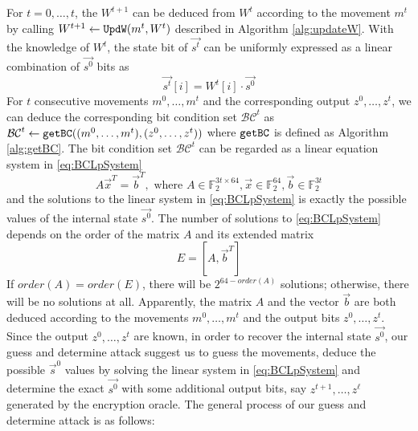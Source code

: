For $t=0,\ldots, t$, the $W^{t+1}$ can be deduced from $W^t$ according to the movement $m^t$ by calling
$W^{t+1}\leftarrow {\tt UpdW}(m^t, W^t)$ described in Algorithm \ref{alg:updateW}.
With the knowledge of $W^t$, the state bit of $\vec{s^t}$ can be uniformly expressed as a linear combination of $\vec{s^0}$ bits as
\begin{equation}\label{eq:ExpressStwithS0}
\vec{s^t}[i]=W^t[i]\cdot \vec{s^0}
\end{equation}
For $t$ consecutive movements $m^0,\ldots,m^t$ and the corresponding output $z^0,\ldots, z^t$, we can deduce the corresponding bit condition set $\mathcal{BC}^t$ as $\mathcal{BC}^t\leftarrow {\tt{getBC}}((m^0,\ldots, m^t), (z^0,\ldots, z^t))$ where ${\tt{getBC}}$ is defined as Algorithm \ref{alg:getBC}.
The bit condition set $\mathcal{BC}^t$ can be regarded as a linear equation system in \eqref{eq:BCLpSystem}
\begin{equation}\label{eq:BCLpSystem}
  A\vec x^T=\vec b^T, \text{ where } A\in \mathbb{F}_2^{3t\times 64}, \vec x\in \mathbb{F}_2^{64}, \vec b\in \mathbb{F}_2^{3t}
\end{equation}
and the solutions to the linear system in \eqref{eq:BCLpSystem} is exactly the possible values of the internal state $\vec{s^0}$.
The number of solutions to \eqref{eq:BCLpSystem} depends on the order of the matrix $A$ and its extended matrix
\begin{equation}\label{eq:ExtendedMatrixOfA}
  E=[A,\vec b^T]
\end{equation}
If $order(A)=order(E)$, there will be $2^{64-order(A)}$ solutions; otherwise, there will be no solutions at all.
Apparently, the matrix $A$ and the vector $\vec b$ are both deduced according to the movements $m^0,\ldots, m^t$ and the output bits $z^0,\ldots, z^t$.
Since the output $z^0,\ldots, z^t$ are known, in order to recover the internal state $\vec{s^0}$, our guess and determine attack suggest us to guess the movements, deduce the possible $\vec s^0$ values by solving the linear system in \eqref{eq:BCLpSystem} and determine the exact $\vec{s^0}$ with some additional output bits, say $z^{t+1},\ldots, z^{\ell}$ generated by the encryption oracle.
The general process of our guess and determine attack is as follows:
